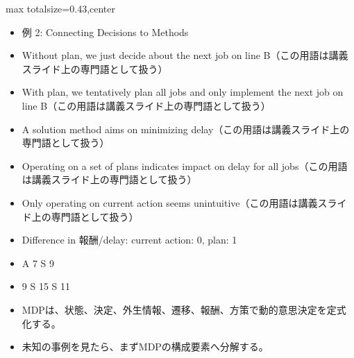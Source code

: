 \clearpage
{}
\begin{minipage}[t]{0.405\textwidth}
\begin{adjustbox}{max totalsize={\textwidth}{0.43\textheight},center}
\begin{minipage}{\textwidth}\scriptsize
{}\begin{itemize}
\item 例 2: Connecting Decisions to Methods
\item Without plan, we just decide about the next job on line B（この用語は講義スライド上の専門語として扱う）
\item With plan, we tentatively plan all jobs and only implement the next job on line B（この用語は講義スライド上の専門語として扱う）
\item A solution method aims on minimizing delay（この用語は講義スライド上の専門語として扱う）
\item Operating on a set of plans indicates impact on delay for all jobs（この用語は講義スライド上の専門語として扱う）
\item Only operating on current action seems unintuitive（この用語は講義スライド上の専門語として扱う）
\item Difference in 報酬/delay: current action: 0, plan: 1
\item A 7 S 9
\item 9 S 15 S 11
\end{itemize}\begin{itemize}
\item MDPは、状態、決定、外生情報、遷移、報酬、方策で動的意思決定を定式化する。
\item 未知の事例を見たら、まずMDPの構成要素へ分解する。
\end{itemize}
\end{minipage}
\end{adjustbox}
\end{minipage}\hfill
